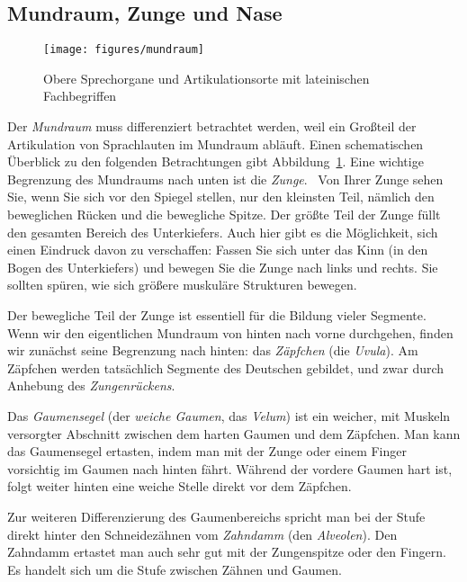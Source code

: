 \subsection{Mundraum, Zunge und Nase}
\label{sec:mundraumzungeundnase}

\begin{figure}[!htbp]
  \centering
  \texttt{[image: figures/mundraum]}
  \caption[Obere Sprechorgane und Artikulationsorte]{Obere Sprechorgane und Artikulationsorte mit lateinischen Fachbegriffen}
  \label{fig:mundraumzungeundnase003}
\end{figure}

Der \textit{Mundraum} muss differenziert betrachtet werden, weil ein Großteil der Artikulation von Sprachlauten im Mundraum abläuft.
Einen schematischen Überblick zu den folgenden Betrachtungen gibt Abbildung~\ref{fig:mundraumzungeundnase003}.
Eine wichtige Begrenzung des Mundraums nach unten ist die \textit{Zunge}.
\TuBegin~Von Ihrer Zunge sehen Sie, wenn Sie sich vor den Spiegel stellen, nur den kleinsten Teil, nämlich den beweglichen Rücken und die bewegliche Spitze.
Der größte Teil der Zunge füllt den gesamten Bereich des Unterkiefers.
Auch hier gibt es die Möglichkeit, sich einen Eindruck davon zu verschaffen:
Fassen Sie sich unter das Kinn (in den Bogen des Unterkiefers) und bewegen Sie die Zunge nach links und rechts.
Sie sollten spüren, wie sich größere muskuläre Strukturen bewegen.

Der bewegliche Teil der Zunge ist essentiell für die Bildung vieler Segmente.
Wenn wir den eigentlichen Mundraum von hinten nach vorne durchgehen, finden wir zunächst seine Begrenzung nach hinten: das \textit{Zäpfchen} (die \textit{Uvula}).
Am Zäpfchen werden tatsächlich Segmente des Deutschen gebildet, und zwar durch Anhebung des \textit{Zungenrückens}.

Das \textit{Gaumensegel} (der \textit{weiche Gaumen}, das \textit{Velum}) ist ein weicher, mit Muskeln versorgter Abschnitt zwischen dem harten Gaumen und dem Zäpfchen.
Man kann das Gaumensegel ertasten, indem man mit der Zunge oder einem Finger vorsichtig im Gaumen nach hinten fährt.
Während der vordere Gaumen hart ist, folgt weiter hinten eine weiche Stelle direkt vor dem Zäpfchen.

Zur weiteren Differenzierung des Gaumenbereichs spricht man bei der Stufe direkt hinter den Schneidezähnen vom \textit{Zahndamm} (den \textit{Alveolen}).
Den Zahndamm ertastet man auch sehr gut mit der Zungenspitze oder den Fingern.
Es handelt sich um die Stufe zwischen Zähnen und Gaumen.

